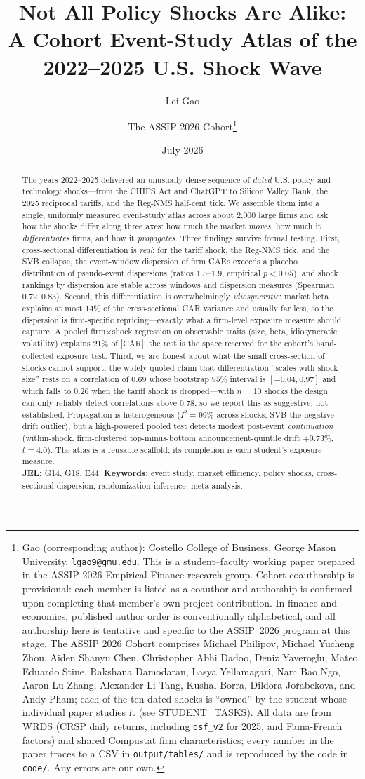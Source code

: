 \documentclass[12pt]{article}
\title{\textbf{Not All Policy Shocks Are Alike:\\
A Cohort Event-Study Atlas of the 2022--2025 U.S. Shock Wave}}
\author{Lei Gao \and The ASSIP 2026 Cohort\thanks{Gao (corresponding author):
Costello College of Business, George Mason University, \texttt{lgao9@gmu.edu}. This is a
student--faculty working paper prepared in the ASSIP 2026 Empirical Finance research group. Cohort coauthorship is provisional: each member is listed as a coauthor and authorship is confirmed upon completing that member's own project contribution. In finance and economics, published author order is conventionally alphabetical, and all authorship here is tentative and specific to the ASSIP~2026 program at this stage.
The ASSIP 2026 Cohort comprises Michael Philipov, Michael Yucheng Zhou, Aiden Shanyu Chen,
Christopher Abhi Dadoo, Deniz Yaveroglu, Mateo Eduardo Stine, Rakshana Damodaran, Lasya
Yellamagari, Nam Bao Ngo, Aaron Lu Zhang, Alexander Li Tang, Kushal Borra, Dildora
Jo\'rabekova, and Andy Pham; each of the ten dated shocks is ``owned'' by the student whose
individual paper studies it (see STUDENT\_TASKS). All data are from WRDS (CRSP daily returns,
including \texttt{dsf\_v2} for 2025, and Fama-French factors) and shared Compustat firm
characteristics; every number in the paper traces to a CSV in \texttt{output/tables/} and is
reproduced by the code in \texttt{code/}. Any errors are our own.}}
\date{July 2026}
\begin{document}
\maketitle

\begin{abstract}
\noindent The years 2022--2025 delivered an unusually dense sequence of \emph{dated} U.S. policy
and technology shocks---from the CHIPS Act and ChatGPT to Silicon Valley Bank, the 2025
reciprocal tariffs, and the Reg-NMS half-cent tick. We assemble them into a single, uniformly
measured event-study atlas across about 2{,}000 large firms and ask how the shocks differ along
three axes: how much the market \emph{moves}, how much it \emph{differentiates} firms, and how it
\emph{propagates}. Three findings survive formal testing. First, cross-sectional differentiation
is \emph{real}: for the tariff shock, the Reg-NMS tick, and the SVB collapse, the event-window
dispersion of firm CARs exceeds a placebo distribution of pseudo-event dispersions (ratios
$1.5$--$1.9$, empirical $p<0.05$), and shock rankings by dispersion are stable across windows and
dispersion measures (Spearman $0.72$--$0.83$). Second, this differentiation is overwhelmingly
\emph{idiosyncratic}: market beta explains at most $14\%$ of the cross-sectional CAR variance and
usually far less, so the dispersion is firm-specific repricing---exactly what a firm-level
exposure measure should capture. A pooled firm$\times$shock regression on observable traits (size,
beta, idiosyncratic volatility) explains $21\%$ of $|\text{CAR}|$; the rest is the space reserved
for the cohort's hand-collected exposure test. Third, we are honest about what the small
cross-section of shocks cannot support: the widely quoted claim that differentiation ``scales with
shock size'' rests on a correlation of $0.69$ whose bootstrap $95\%$ interval is $[-0.04,0.97]$
and which falls to $0.26$ when the tariff shock is dropped---with $n=10$ shocks the design can
only reliably detect correlations above $0.78$, so we report this as suggestive, not established.
Propagation is heterogeneous ($I^2=99\%$ across shocks; SVB the negative-drift outlier), but a
high-powered pooled test detects modest post-event \emph{continuation} (within-shock, firm-clustered
top-minus-bottom announcement-quintile drift $+0.73\%$, $t=4.0$). The atlas is a reusable scaffold; its completion
is each student's exposure measure.\\[4pt]
\noindent\textbf{JEL:} G14, G18, E44. \quad
\textbf{Keywords:} event study, market efficiency, policy shocks, cross-sectional dispersion,
randomization inference, meta-analysis.
\end{abstract}
\end{document}

